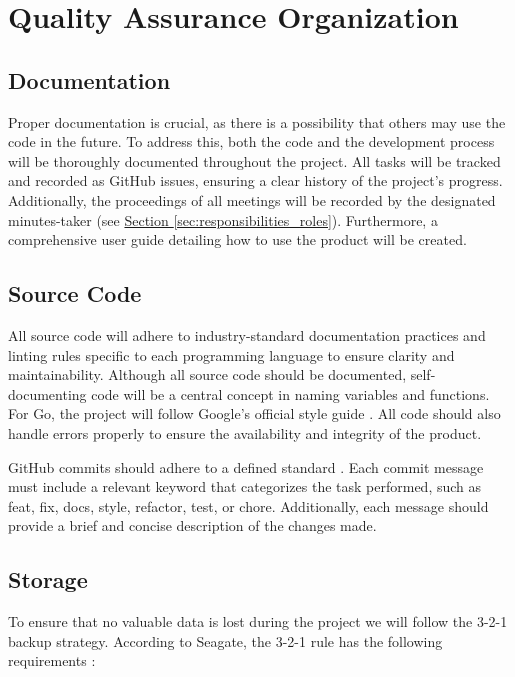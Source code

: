 \section{Quality Assurance Organization}

\subsection{Documentation}\label{sec:documentation}
Proper documentation is crucial, as there is a possibility that others may use the code in the future. To address this, both the code and the development process will be thoroughly documented throughout the project. All tasks will be tracked and recorded as GitHub issues, ensuring a clear history of the project's progress. Additionally, the proceedings of all meetings will be recorded by the designated minutes-taker (see \hyperref[sec:responsibilities_roles]{Section \ref*{sec:responsibilities_roles}}). Furthermore, a comprehensive user guide detailing how to use the product will be created.  

\subsection{Source Code}  

All source code will adhere to industry-standard documentation practices and linting rules specific to each programming language to ensure clarity and maintainability. Although all source code should be documented, self-documenting code will be a central concept in naming variables and functions. For Go, the project will follow Google's official style guide \cite{google_go_style}. All code should also handle errors properly to ensure the availability and integrity of the product.

GitHub commits should adhere to a defined standard \cite{commit_standard}. Each commit message must include a relevant keyword that categorizes the task performed, such as feat, fix, docs, style, refactor, test, or chore. Additionally, each message should provide a brief and concise description of the changes made. 

\subsection{Storage}\label{sec:storage}

To ensure that no valuable data is lost during the project we will follow the 3-2-1 backup strategy. According to Seagate, the 3-2-1 rule has the following requirements \cite{3-2-1_data_storage}:

